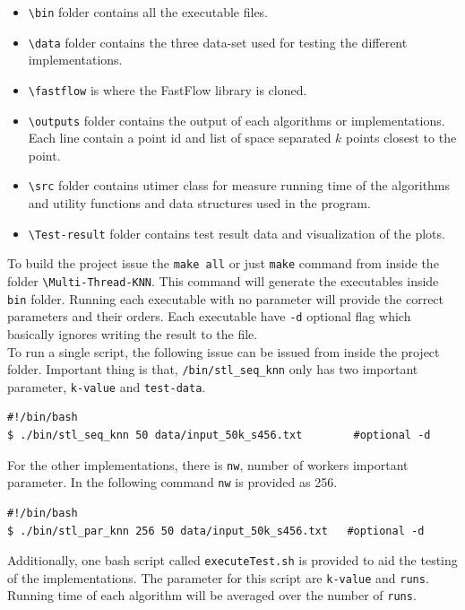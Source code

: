 \documentclass[12pt,a4paper]{report}
\begin{document}
\begin{itemize}
  \item \verb|\bin| folder contains all the executable files.
  \item \verb|\data| folder contains the three data-set used for testing the different implementations.
  \item \verb|\fastflow| is where the FastFlow library is cloned.
  \item \verb|\outputs| folder contains the output of each algorithms or implementations. Each line contain a point id and list of space separated $k$ points closest to the point.
  \item \verb|\src| folder contains utimer class for measure running time of the algorithms and utility functions and data structures used in the program.
  \item \verb|\Test-result| folder contains test result data and visualization of the plots.
\end{itemize}

To build the project issue the \verb|make all| or just \verb|make| command from inside the folder \verb|\Multi-Thread-KNN|. This command will generate the executables inside \verb|bin| folder. Running each executable with no parameter will provide the correct parameters and their orders. Each executable have \verb|-d| optional flag which basically ignores writing the result to the file.\\

To run a single script, the following issue can be issued from inside the project folder. Important thing is that, \verb|/bin/stl_seq_knn| only has two important parameter, \verb|k-value| and \verb|test-data|.

\begin{verbatim}
#!/bin/bash
$ ./bin/stl_seq_knn 50 data/input_50k_s456.txt        #optional -d 
\end{verbatim}

For the other implementations, there is \verb|nw|, number of workers important parameter. In the following command \verb|nw| is provided as 256. 

\begin{verbatim}
#!/bin/bash
$ ./bin/stl_par_knn 256 50 data/input_50k_s456.txt   #optional -d
\end{verbatim}

Additionally, one bash script called \verb|executeTest.sh| is provided to aid the testing of the implementations. The parameter for this script are \verb|k-value| and \verb|runs|. Running time of each algorithm will be averaged over the number of \verb|runs|.
\end{document}
